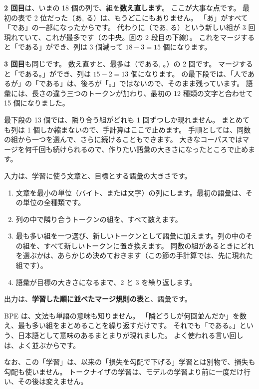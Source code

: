 \textbf{2 回目}は、いまの 18 個の列で、組を\textbf{数え直します}。
ここが大事な点です。
最初の表で 2 位だった（あ, る）は、もうどこにもありません。
「あ」がすべて「であ」の一部になったからです。
代わりに（であ, る）という新しい組が 3 回現れていて、これが最多です（の中央。図の 2 段目の下線）。
これをマージすると「である」ができ、列は 3 個減って $18-3=15$ 個になります。

\textbf{3 回目}も同じです。
数え直すと、最多は（である, 。）の 2 回です。
マージすると「である。」ができ、列は $15-2=13$ 個になります。
の最下段では、「人であるが」の「である」は、後ろが「。」ではないので、そのまま残っています。
語彙には、長さの違う三つのトークンが加わり、最初の 12 種類の文字と合わせて 15 個になりました。

最下段の 13 個では、隣り合う組がどれも 1 回ずつしか現れません。
まとめても列は 1 個しか縮まないので、手計算はここで止めます。
手順としては、同数の組から一つを選んで、さらに続けることもできます。
大きなコーパスではマージを何千回も続けられるので、作りたい語彙の大きさになったところで止めます。

\begin{definition}\label{def:tok-bpe}
入力は、学習に使う文章と、目標とする語彙の大きさです。
\begin{enumerate}[leftmargin=1.6em]
\item 文章を最小の単位（バイト、または文字）の列にします。最初の語彙は、その単位の全種類です。
\item 列の中で隣り合うトークンの組を、すべて数えます。
\item 最も多い組を一つ選び、新しいトークンとして語彙に加えます。列の中のその組を、すべて新しいトークンに置き換えます。
同数の組があるときにどれを選ぶかは、あらかじめ決めておきます（この節の手計算では、先に現れた組です）。
\item 語彙が目標の大きさになるまで、2 と 3 を繰り返します。
\end{enumerate}
出力は、\textbf{学習した順に並べたマージ規則の表}と、語彙です。
\end{definition}

BPE は、文法も単語の意味も知りません。
「隣どうしが何回並んだか」を数え、最も多い組をまとめることを繰り返すだけです。
それでも「である。」という、日本語として意味のあるまとまりが現れました。
よく使われる言い回しは、よく並ぶからです。

なお、この「学習」は、以来の「損失を勾配で下げる」学習とは別物で、損失も勾配も使いません。
トークナイザの学習は、モデルの学習より前に一度だけ行い、その後は変えません。

